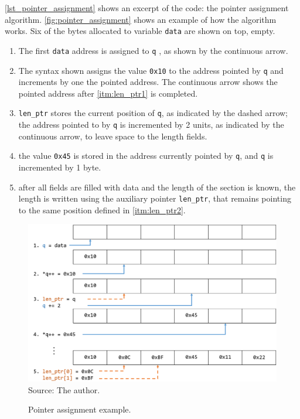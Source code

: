 \documentclass[
	12pt,				%
	openright,			%
	twoside,			%
	a4paper,			%
	brazil,
	french,				%
	english
	]{abntex2}
\begin{document}
\autoref{lst_pointer_assignment} shows an excerpt of the code: the pointer assignment algorithm. \autoref{fig:pointer_assignment} shows an example of how the  algorithm works. Six of the bytes allocated to variable \texttt{data} are shown on top, empty.
\begin{enumerate}
\item The first \texttt{data} address is assigned to \texttt{q} , as shown by the continuous arrow.
\item \label{itm:len_ptr1} The syntax shown assigns the value \texttt{0x10} to the address pointed by \texttt{q} and increments by one the pointed address. The continuous arrow shows the pointed address after \autoref{itm:len_ptr1} is completed.
\item \label{itm:len_ptr2} \texttt{len\hspace{0.1mm}\_\hspace{0.1mm}ptr} stores the current position of \texttt{q}, as indicated by the dashed arrow; the address pointed to by \texttt{q} is incremented by 2 units, as indicated by the continuous arrow, to leave space to the length fields.
\item the value \texttt{0x45} is stored in the address currently pointed by \texttt{q}, and \texttt{q} is incremented by 1 byte.
\item after all fields are filled with data and the length of the section is known, the length is written using the auxiliary pointer \texttt{len\hspace{0.1mm}\_\hspace{0.1mm}ptr}, that remains pointing to the same position defined in \autoref{itm:len_ptr2}.
\end{enumerate}

\begin{figure}[!h]
\centering
\caption{Pointer assignment example.}
\includegraphics[width=0.8\linewidth]{figuras/pointer_assignment.png}
\\Source: The author.
\label{fig:pointer_assignment}
\end{figure}
\end{document}
